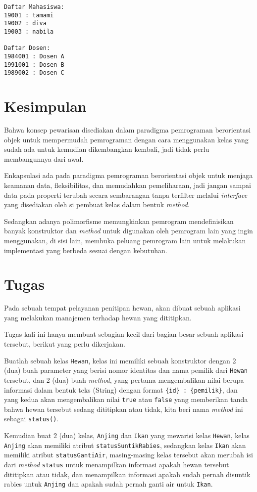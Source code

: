 \begin{lstlisting}
Daftar Mahasiswa:
19001 : tamami
19002 : diva
19003 : nabila

Daftar Dosen:
1984001 : Dosen A
1991001 : Dosen B
1989002 : Dosen C
\end{lstlisting}

\section{Kesimpulan}

Bahwa konsep pewarisan disediakan dalam paradigma pemrograman berorientasi objek untuk mempermudah pemrograman dengan cara menggunakan kelas yang sudah ada untuk kemudian dikembangkan kembali, jadi tidak perlu membangunnya dari awal.

Enkapsulasi ada pada paradigma pemrograman berorientasi objek untuk menjaga keamanan data, fleksibilitas, dan memudahkan pemeliharaan, jadi jangan sampai data pada properti terubah secara sembarangan tanpa terfilter melalui \textit{interface} yang disediakan oleh si pembuat kelas dalam bentuk \textit{method}.

Sedangkan adanya polimorfisme memungkinkan pemrogram mendefinisikan banyak konstruktor dan \textit{method} untuk digunakan oleh pemrogram lain yang ingin menggunakan, di sisi lain, membuka peluang pemrogram lain untuk melakukan implementasi yang berbeda sesuai dengan kebutuhan.

\section{Tugas}

Pada sebuah tempat pelayanan penitipan hewan, akan dibuat sebuah aplikasi yang melakukan manajemen terhadap hewan yang dititipkan.

Tugas kali ini hanya membuat sebagian kecil dari bagian besar sebuah aplikasi tersebut, berikut yang perlu dikerjakan.

Buatlah sebuah kelas \texttt{Hewan}, kelas ini memiliki sebuah konstruktor dengan 2 (dua) buah parameter yang berisi nomor identitas dan nama pemilik dari \texttt{Hewan} tersebut, dan 2 (dua) buah \textit{method}, yang pertama mengembalikan nilai berupa informasi dalam bentuk teks (String) dengan format \texttt{\{id\} : \{pemilik\}}, dan yang kedua akan mengembalikan nilai \texttt{true} atau \texttt{false} yang memberikan tanda bahwa hewan tersebut sedang dititipkan atau tidak, kita beri nama \textit{method} ini sebagai \texttt{status()}.

Kemudian buat 2 (dua) kelas, \texttt{Anjing} dan \texttt{Ikan} yang mewarisi kelas \texttt{Hewan}, kelas \texttt{Anjing} akan memiliki atribut \texttt{statusSuntikRabies}, sedangkan kelas \texttt{Ikan} akan memiliki atribut \texttt{statusGantiAir}, masing-masing kelas tersebut akan merubah isi dari \textit{method} \texttt{status} untuk menampilkan informasi apakah hewan tersebut dititipkan atau tidak, dan menampilkan informasi apakah sudah pernah disuntik rabies untuk \texttt{Anjing} dan apakah sudah pernah ganti air untuk \texttt{Ikan}.